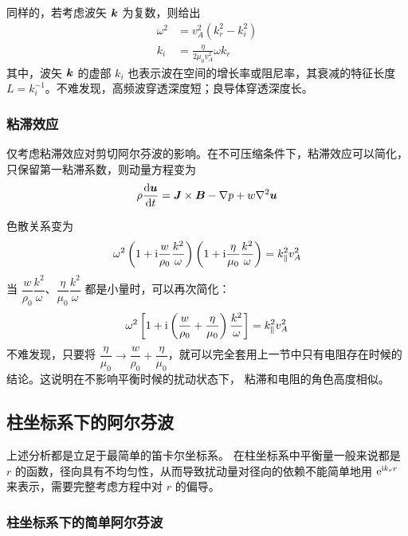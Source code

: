 同样的，若考虑波矢 $\bm{k}$ 为复数，则给出
\begin{subequations}\begin{align}
\omega^2 &= v_A^2 (k_r^2 - k_i^2) \\
k_i &= \frac{\eta}{2 \mu_0 v_A^2} \omega k_r
\end{align}\end{subequations}
其中，波矢 $\bm{k}$ 的虚部 $k_i$ 也表示波在空间的增长率或阻尼率，其衰减的特征长度 $L = k_i^{-1}$。不难发现，高频波穿透深度短；良导体穿透深度长。

\subsubsection{粘滞效应}

仅考虑粘滞效应对剪切阿尔芬波的影响。在不可压缩条件下，粘滞效应可以简化，只保留第一粘滞系数，则动量方程变为
\begin{equation}
\rho \frac{\mathop{}\!\mathrm{d} {\bm{u}}}{\mathop{}\!\mathrm{d} {t}} = \bm{J} \times \bm{B} - \nabla {p} + w \nabla^2 {\bm{u}}
\end{equation}

色散关系变为
\begin{equation}
\omega^2 \left(1 + \mathrm{i} \frac{w}{\rho_0} \frac{k^2}{\omega}\right)
\left(1 + \mathrm{i} \frac{\eta}{\mu_0} \frac{k^2}{\omega}\right) = k_\parallel^2 v_A^2
\end{equation}
当 $\dfrac{w}{\rho_0} \dfrac{k^2}{\omega}$、$\dfrac{\eta}{\mu_0} \dfrac{k^2}{\omega}$ 都是小量时，可以再次简化：
\begin{equation}
\omega^2 \left[1 + \mathrm{i} \left(\frac{w}{\rho_0} + \frac{\eta}{\mu_0}\right) \frac{k^2}{\omega}\right] = k_\parallel^2 v_A^2
\end{equation}
不难发现，只要将 $\dfrac{\eta}{\mu_0} \rightarrow \dfrac{w}{\rho_0} + \dfrac{\eta}{\mu_0}$，就可以完全套用上一节中只有电阻存在时候的结论。这说明在不影响平衡时候的扰动状态下，
粘滞和电阻的角色高度相似。

\subsection{柱坐标系下的阿尔芬波}

上述分析都是立足于最简单的笛卡尔坐标系。
在柱坐标系中平衡量一般来说都是 $r$ 的函数，径向具有不均匀性，从而导致扰动量对径向的依赖不能简单地用 $\mathrm{e}^{\mathrm{i} k_r r}$ 来表示，需要完整考虑方程中对 $r$ 的偏导。

\subsubsection{柱坐标系下的简单阿尔芬波}

